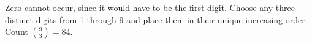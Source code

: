Zero cannot occur, since it would have to be the first digit. Choose any three distinct digits from 1 through 9 and place them in their unique increasing order. Count $\binom93=\boxed{84}$.
